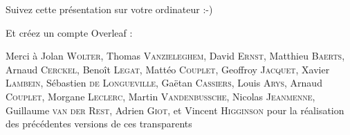 \begin{frame}
  \begin{center}\Large
  Suivez cette présentation sur votre ordinateur :-)

  \vspace{1cm}


  \vspace{1cm}

  Et créez un compte Overleaf :

  \vspace{1cm}

  \end{center}
\end{frame}


\begin{frame}
  \maketitle
  Merci à Jolan \textsc{Wolter}, Thomas \textsc{Vanzieleghem}, David \textsc{Ernst}, Matthieu \textsc{Baerts},
  Arnaud \textsc{Cerckel}, Benoît \textsc{Legat}, Mattéo \textsc{Couplet}, Geoffroy \textsc{Jacquet},
  Xavier \textsc{Lambein}, Sébastien \textsc{de Longueville}, Gaëtan \textsc{Cassiers}, Louis \textsc{Arys},
  Arnaud \textsc{Couplet}, Morgane \textsc{Leclerc},  Martin \textsc{Vandenbussche}, Nicolas \textsc{Jeanmenne},
  Guillaume \textsc{van der Rest}, Adrien \textsc{Giot}, et Vincent \textsc{Higginson} pour la réalisation des précédentes versions de ces transparents
\end{frame}
